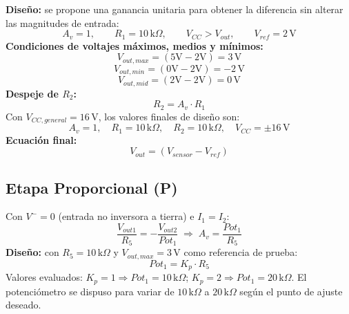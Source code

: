 \documentclass[conference]{IEEEtran}
\begin{document}
\textbf{Diseño:} se propone una ganancia unitaria para obtener la diferencia sin alterar las magnitudes de entrada:
\begin{equation}
A_v=1,\qquad R_1=10\,\text{k}\Omega,\qquad V_{CC}>V_{out},\qquad V_{ref}=2\,\text{V}
\end{equation}
\textbf{Condiciones de voltajes máximos, medios y mínimos:}
\begin{equation}
V_{out,max}=(5\text{V}-2\text{V})=\boxed{3\,\text{V}}
\end{equation}
\begin{equation}
V_{out,min}=(0\text{V}-2\text{V})=\boxed{-2\,\text{V}}
\end{equation}
\begin{equation}
V_{out,mid}=(2\text{V}-2\text{V})=\boxed{0\,\text{V}}
\end{equation}
\textbf{Despeje de $R_2$:}
\begin{equation}
R_2=A_v\cdot R_1
\end{equation}
Con $V_{CC,general}=16\,\text{V}$, los valores finales de diseño son:
\begin{equation}
A_v=1,\quad R_1=10\,\text{k}\Omega,\quad R_2=10\,\text{k}\Omega,\quad V_{CC}=\pm16\,\text{V}
\end{equation}
\textbf{Ecuación final:}
\begin{equation}
V_{out}=\left(V_{sensor}-V_{ref}\right)
\end{equation}

\subsection{Etapa Proporcional (P)}
Con $V^-=0$ (entrada no inversora a tierra) e $I_1=I_2$:
\begin{equation}
\frac{V_{out1}}{R_5}=-\frac{V_{out2}}{Pot_1} \;\Rightarrow\; \boxed{A_v=\frac{Pot_1}{R_5}}
\label{eq:p_full}
\end{equation}
\textbf{Diseño:} con $R_5=10\,\text{k}\Omega$ y $V_{out,max}=3\,\text{V}$ como referencia de prueba:
\begin{equation}
Pot_1 = K_p\cdot R_5
\end{equation}
Valores evaluados: $K_p=1\Rightarrow Pot_1=10\,\text{k}\Omega$; $K_p=2\Rightarrow Pot_1=20\,\text{k}\Omega$. El potenciómetro se dispuso para variar de $10\,\text{k}\Omega$ a $20\,\text{k}\Omega$ según el punto de ajuste deseado.
\end{document}

